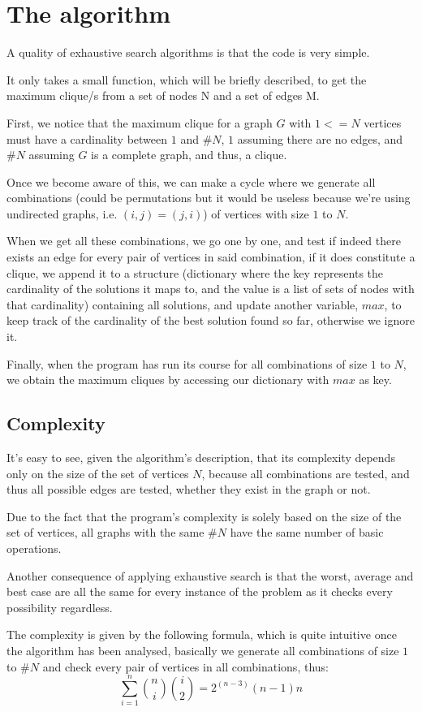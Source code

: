 \documentclass[...]{revdetua}
\begin{document}
\section{The algorithm}
A quality of exhaustive search algorithms is that the code is very simple.\par
It only takes a small function, which will be briefly described, to get the maximum clique/s from a set of nodes N and a set of edges M.\par
First, we notice that the maximum clique for a graph $G$ with $1<=N$ vertices must have a cardinality between $1$ and $\#N$, $1$ assuming there are no edges, and $\#N$ assuming $G$ is a complete graph, and thus, a clique.\par
Once we become aware of this, we can make a cycle where we generate all combinations (could be permutations but it would be useless because we're using undirected graphs, i.e. $(i,j)=(j,i)$) of vertices with size $1$ to $N$.\par
When we get all these combinations, we go one by one, and test if indeed there exists an edge for every pair of vertices in said combination, if it does constitute a clique, we append it to a structure (dictionary where the key represents the cardinality of the solutions it maps to, and the value is a list of sets of nodes with that cardinality) containing all solutions, and update another variable, $max$, to keep track of the cardinality of the best solution found so far, otherwise we ignore it.\par
Finally, when the program has run its course for all combinations of size $1$ to $N$, we obtain the maximum cliques by accessing our dictionary with $max$ as key.
	
\subsection{Complexity}
It's easy to see, given the algorithm's description, that its complexity depends only on the size of the set of vertices $N$, because all combinations are tested, and thus all possible edges are tested, whether they exist in the graph or not.\par
Due to the fact that the program's complexity is solely based on the size of the set of vertices, all graphs with the same $\#N$ have the same number of basic operations.\par
Another consequence of applying exhaustive search is that the worst, average and best case are all the same for every instance of the problem as it checks every possibility regardless. \par
The complexity is given by the following formula, which is quite intuitive once the algorithm has been analysed, basically we generate all combinations of size $1$ to $\#N$ and check every pair of vertices in all combinations, thus: 
$$\sum_{i=1}^{n}{{n}\choose{i}}{{i}\choose{2}}=2^{(n-3)}(n-1)n$$
\end{document}
